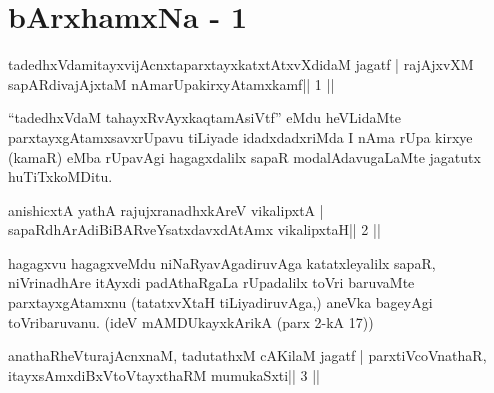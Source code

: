 



\chapter{bArxhamxNa - 1}


\begin{shl}
tadedhxVdamitayxvijAcnxtaparxtayxkatxtAtxvXdidaM jagatf |
rajAjxvXM sapARdivajAjxtaM nAmarUpakirxyAtamxkamf\hfill || 1 ||
\end{shl}

\begin{artha}
``tadedhxVdaM tahayxRvAyxkaqtamAsiVtf'' eMdu heVLidaMte parxtayxgAtamxsavxrUpavu tiLiyade idadxdadxriMda I nAma rUpa kirxye (kamaR) eMba rUpavAgi hagagxdalilx sapaR modalAdavugaLaMte jagatutx huTiTxkoMDitu.
\end{artha} 
 

\begin{shl}
anishicxtA yathA rajujxranadhxkAreV vikalipxtA |
sapaRdhArAdiBiBARveYsatxdavxdAtAmx vikalipxtaH\hfill || 2 ||
\end{shl}

\begin{artha}
hagagxvu hagagxveMdu niNaRyavAgadiruvAga katatxleyalilx sapaR, 
niVrinadhAre itAyxdi padAthaRgaLa rUpadalilx toVri baruvaMte 
parxtayxgAtamxnu (tatatxvXtaH tiLiyadiruvAga,) aneVka bageyAgi 
toVribaruvanu. (ideV mAMDUkayxkArikA (parx 2-kA 17)) 
\end{artha}


\begin{shl}
anathaRheVturajAcnxnaM, tadutathxM cAKilaM jagatf |
parxtiVcoV\s nathaR, itayxsAmxdiBxVtoV\s tayxthaRM mumukaSxti\hfill || 3 ||
\end{shl}

